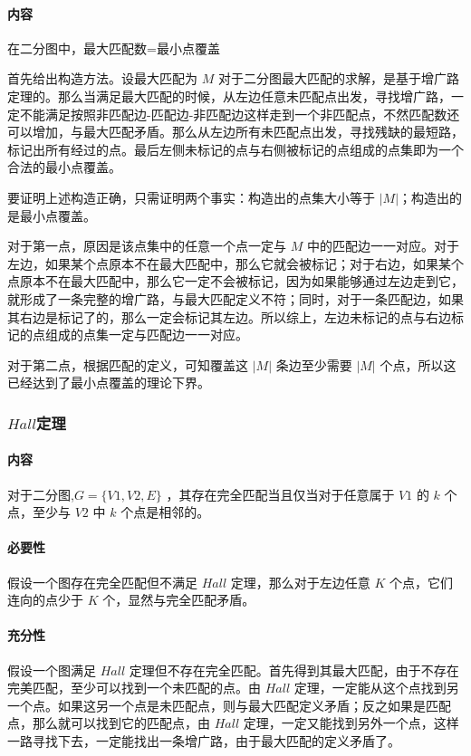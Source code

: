 \documentclass[UTF-8]{ctexart}
\begin{document}
			\paragraph{内容} 在二分图中，最大匹配数=最小点覆盖
			
			首先给出构造方法。设最大匹配为 $M$ 对于二分图最大匹配的求解，是基于增广路定理的。那么当满足最大匹配的时候，从左边任意未匹配点出发，寻找增广路，一定不能满足按照非匹配边-匹配边-非匹配边这样走到一个非匹配点，不然匹配数还可以增加，与最大匹配矛盾。那么从左边所有未匹配点出发，寻找残缺的最短路，标记出所有经过的点。最后左侧未标记的点与右侧被标记的点组成的点集即为一个合法的最小点覆盖。
			
			要证明上述构造正确，只需证明两个事实：构造出的点集大小等于 $|M|$；构造出的是最小点覆盖。
			
			对于第一点，原因是该点集中的任意一个点一定与 $M$ 中的匹配边一一对应。对于左边，如果某个点原本不在最大匹配中，那么它就会被标记；对于右边，如果某个点原本不在最大匹配中，那么它一定不会被标记，因为如果能够通过左边走到它，就形成了一条完整的增广路，与最大匹配定义不符；同时，对于一条匹配边，如果其右边是标记了的，那么一定会标记其左边。所以综上，左边未标记的点与右边标记的点组成的点集一定与匹配边一一对应。
			
			对于第二点，根据匹配的定义，可知覆盖这 $|M|$ 条边至少需要 $|M|$ 个点，所以这已经达到了最小点覆盖的理论下界。
			
			\subsubsection{$Hall$定理}
			\paragraph{内容} 对于二分图,$G=\{V1,V2,E\}$ ，其存在完全匹配当且仅当对于任意属于 $V1$ 的 $k$ 个点，至少与 $V2$ 中 $k$ 个点是相邻的。
			
			\paragraph{必要性} 假设一个图存在完全匹配但不满足 $Hall$ 定理，那么对于左边任意 $K$ 个点，它们连向的点少于 $K$ 个，显然与完全匹配矛盾。
			
			\paragraph{充分性} 假设一个图满足 $Hall$ 定理但不存在完全匹配。首先得到其最大匹配，由于不存在完美匹配，至少可以找到一个未匹配的点。由 $Hall$ 定理，一定能从这个点找到另一个点。如果这另一个点是未匹配点，则与最大匹配定义矛盾；反之如果是匹配点，那么就可以找到它的匹配点，由 $Hall$ 定理，一定又能找到另外一个点，这样一路寻找下去，一定能找出一条增广路，由于最大匹配的定义矛盾了。
				
\end{document}
